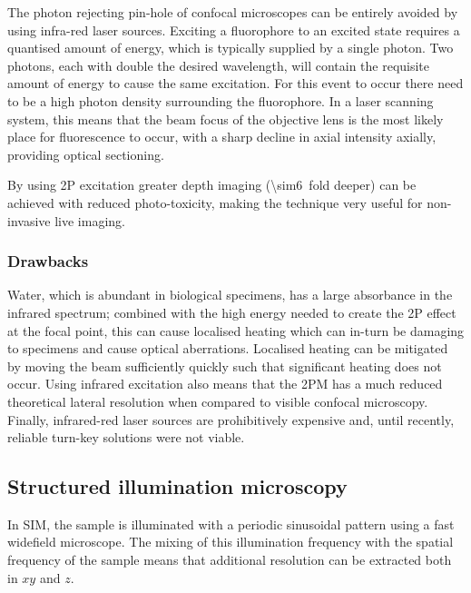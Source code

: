 
The photon rejecting pin-hole of confocal microscopes can be entirely avoided by using infra-red laser sources.
Exciting a fluorophore to an excited state requires a quantised amount of energy, which is typically supplied by a single photon.
Two photons, each with double the desired wavelength, will contain the requisite amount of energy to cause the same excitation.
For this event to occur there need to be a high photon density surrounding the fluorophore.
In a laser scanning system, this means that the beam focus of the objective lens is the most likely place for fluorescence to occur, with a sharp decline in axial intensity axially, providing optical sectioning.

By using 2P excitation greater depth imaging (\SI{\sim6}{fold} deeper) can be achieved with reduced photo-toxicity, making the technique very useful for non-invasive live imaging.

\subsubsection{Drawbacks}

Water, which is abundant in biological specimens, has a large absorbance in the infrared spectrum; combined with the high energy needed to create the 2P effect at the focal point, this can cause localised heating which can in-turn be damaging to specimens and cause optical aberrations.
Localised heating can be mitigated by moving the beam sufficiently quickly such that significant heating does not occur.
Using infrared excitation also means that the 2PM has a much reduced theoretical lateral resolution when compared to visible confocal microscopy.
Finally, infrared-red laser sources are prohibitively expensive and, until recently, reliable turn-key solutions were not viable.

\subsection{Structured illumination microscopy}

In SIM, the sample is illuminated with a periodic sinusoidal pattern using a fast widefield microscope.
The mixing of this illumination frequency with the spatial frequency of the sample means that additional resolution can be extracted both in $xy$ and $z$.

